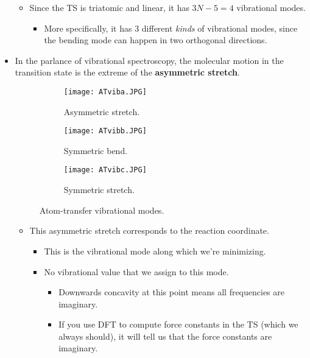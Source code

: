 \documentclass[../notes.tex]{subfiles}
\begin{document}
\begin{itemize}
\begin{itemize}
\begin{itemize}
        \end{itemize}
        \item Since the TS is triatomic and linear, it has $3N-5=4$ vibrational modes.
        \begin{itemize}
            \item More specifically, it has 3 different \emph{kinds} of vibrational modes, since the bending mode can happen in two orthogonal directions.
        \end{itemize}
    \end{itemize}
    \item In the parlance of vibrational spectroscopy, the molecular motion in the transition state is the extreme of the \textbf{asymmetric stretch}.
    \begin{figure}[h!]
        \centering
        \begin{subfigure}[b]{0.25\linewidth}
            \centering
            \texttt{[image: ATviba.JPG]}
            \caption{Asymmetric stretch.}
            \label{fig:ATviba}
        \end{subfigure}
        \begin{subfigure}[b]{0.25\linewidth}
            \centering
            \texttt{[image: ATvibb.JPG]}
            \caption{Symmetric bend.}
            \label{fig:ATvibb}
        \end{subfigure}
        \begin{subfigure}[b]{0.25\linewidth}
            \centering
            \texttt{[image: ATvibc.JPG]}
            \caption{Symmetric stretch.}
            \label{fig:ATvibc}
        \end{subfigure}
        \caption{Atom-transfer vibrational modes.}
        \label{fig:ATvib}
    \end{figure}
    \pagebreak
    \begin{itemize}
        \item This asymmetric stretch corresponds to the reaction coordinate.
        \begin{itemize}
            \item This is the vibrational mode along which we're minimizing.
            \item No vibrational value that we assign to this mode.
            \begin{itemize}
                \item Downwards concavity at this point means all frequencies are imaginary.
                \item If you use DFT to compute force constants in the TS (which we always should), it will tell us that the force constants are imaginary.

\end{itemize}
\end{itemize}
\end{itemize}
\end{itemize}
\end{document}
